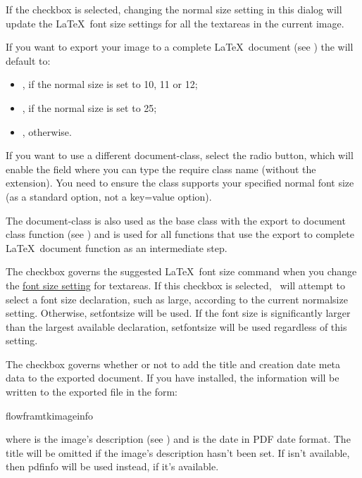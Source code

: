 
If the  \gls*{checkbox} is selected,
changing the normal size setting in this dialog will update the
\LaTeX\ font size settings for all the \glspl{textarea} in the
current image.


If you want to export your image to a complete \LaTeX\ document (see
) the  will default to:
\begin{itemize}
\item {}, if the normal size is
set to 10, 11 or 12;
\item {}, if the normal size is set to
25;
\item {}, otherwise.
\end{itemize}


If you want to use a different \gls{document-class}, select the
 radio button, which will enable the
field where you can type the require class name (without the
 extension). You need to ensure the class supports your
specified normal font size (as a standard option, not a key=value
option).

The \gls{document-class} is also used as the base class with the export to
document class function (see ) and is used
for all  functions that use the export to complete \LaTeX\
document function as an intermediate step.


The  \gls*{checkbox} governs
the suggested \LaTeX\ font size command when you change the
\hyperref[sec:fontsize]{font size setting} for \glspl{textarea}. If
this \gls*{checkbox} is selected, \FlowframTk\ will attempt to select a
font size declaration, such as \gls{large}, according to the current
normalsize setting. Otherwise, \gls{setfontsize} will be used. If
the font size is significantly larger than the largest available
declaration, \gls{setfontsize} will be used regardless of this
setting.


The  \gls*{checkbox} governs whether or
not to add the title and creation date meta data to the exported
document. If you have \sty{flowframtkutils} installed, the
information will be written to the exported file in the form:
\begin{compactcodebox}
\gls{flowframtkimageinfo}
\end{compactcodebox}%
where  is the image's description
(see ) and 
is the date in PDF date format. The title will be omitted if the
image's description hasn't been set.
If  isn't available, then \gls{pdfinfo} will be
used instead, if it's available.


